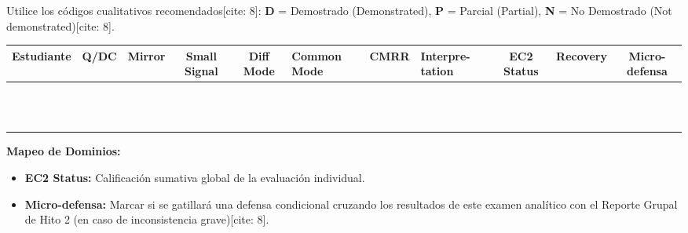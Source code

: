 \documentclass[10pt, a4paper, landscape]{article}
\begin{document}
\begin{tcolorbox}[colback=ucbblue!5, colframe=ucbblue, title=\textbf{Hoja de Calificación Rápida — Mapeo de Competencias EC2}]
    Utilice los códigos cualitativos recomendados[cite: 8]: \textbf{D} = Demostrado (Demonstrated), \textbf{P} = Parcial (Partial), \textbf{N} = No Demostrado (Not demonstrated)[cite: 8].
\end{tcolorbox}

\renewcommand{\arraystretch}{2}
\begin{tabularx}{\textwidth}{|p{4cm}|C|C|C|C|p{1.5cm}|C|p{2cm}|C|C|C|}
\hline
{}
\textbf{Estudiante} & \textbf{Q/DC} & \textbf{Mirror} & \textbf{Small Signal} & \textbf{Diff Mode} & \textbf{Common Mode} & \textbf{CMRR} & \textbf{Interpre-tation} & \textbf{EC2 Status} & \textbf{Recovery} & \textbf{Micro-defensa} \\ \hline
 & & & & & & & & & & \\ \hline
 & & & & & & & & & & \\ \hline
 & & & & & & & & & & \\ \hline
 & & & & & & & & & & \\ \hline
 & & & & & & & & & & \\ \hline
 & & & & & & & & & & \\ \hline
 & & & & & & & & & & \\ \hline
 & & & & & & & & & & \\ \hline
 & & & & & & & & & & \\ \hline
 & & & & & & & & & & \\ \hline
 & & & & & & & & & & \\ \hline
 & & & & & & & & & & \\ \hline
\end{tabularx}

\vspace{0.5cm}
\textbf{Mapeo de Dominios:}
\begin{itemize}
    \item \textbf{EC2 Status:} Calificación sumativa global de la evaluación individual.
    \item \textbf{Micro-defensa:} Marcar si se gatillará una defensa condicional cruzando los resultados de este examen analítico con el Reporte Grupal de Hito 2 (en caso de inconsistencia grave)[cite: 8].
\end{itemize}
\end{document}
